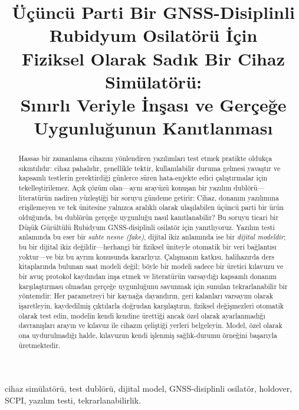 \documentclass[conference]{IEEEtran}
\begin{document}
\title{Üçüncü Parti Bir GNSS-Disiplinli Rubidyum Osilatörü İçin\\ Fiziksel Olarak Sadık Bir Cihaz Simülatörü:\\ Sınırlı Veriyle İnşası ve Gerçeğe Uygunluğunun Kanıtlanması}

\author{
}

\maketitle

\begin{abstract}
Hassas bir zamanlama cihazını yönlendiren yazılımları test etmek pratikte oldukça sıkıntılıdır: cihaz pahalıdır, genellikle tektir, kullanılabilir duruma gelmesi yavaştır ve kapsamlı testlerin gerektirdiği günlerce süren hata-enjekte edici çalıştırmalar için tekelleştirilemez. Açık çözüm olan---aynı arayüzü konuşan bir yazılım dublörü---literatürün nadiren yüzleştiği bir soruyu gündeme getirir: Cihaz, donanım yazılımına erişilemeyen ve tek ünitesine yalnızca aralıklı olarak ulaşılabilen üçüncü parti bir ürün olduğunda, bu dublörün gerçeğe uygunluğu nasıl kanıtlanabilir? Bu soruyu ticari bir Düşük Gürültülü Rubidyum GNSS-disiplinli osilatör için yanıtlıyoruz. Yazılım testi anlamında bu eser bir \emph{sahte nesne (fake)}, dijital ikiz anlamında ise bir \emph{dijital modeldir}; bu bir dijital ikiz değildir---herhangi bir fiziksel üniteyle otomatik bir veri bağlantısı yoktur---ve biz bu ayrım konusunda kararlıyız. Çalışmanın katkısı, halihazırda ders kitaplarında bulunan saat modeli değil; böyle bir modeli sadece bir üretici kılavuzu ve bir avuç protokol kaydından inşa etmek ve literatürün varsaydığı kapsamlı donanım karşılaştırması olmadan gerçeğe uygunluğunu savunmak için sunulan tekrarlanabilir bir yöntemdir: Her parametreyi bir kaynağa dayandırın, geri kalanları varsayım olarak işaretleyin, kaydedilmiş çıktılarla doğrudan karşılaştırın, fiziksel değişmezleri otomatik olarak test edin, modelin kendi kendine ürettiği ancak özel olarak ayarlanmadığı davranışları arayın ve kılavuz ile cihazın çeliştiği yerleri belgeleyin. Model, özel olarak ona uydurulmadığı halde, kılavuzun kendi işlenmiş sağlık-durumu örneğini başarıyla üretmektedir.
\end{abstract}

\begin{IEEEkeywords}
cihaz simülatörü, test dublörü, dijital model, GNSS-disiplinli osilatör, holdover, SCPI, yazılım testi, tekrarlanabilirlik.
\end{IEEEkeywords}
\end{document}
